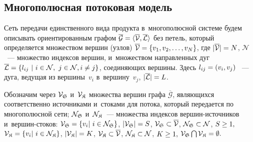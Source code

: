 \begin{multicols}{2}
\vspace*{-4pt}

\section{Многополюсная потоковая модель}

\vspace*{-2pt}

Сеть передачи единственного вида продукта в~многополюсной 
системе будем описывать ориентированным графом $\overline {\mathcal{G}} \hm= 
\langle \overline{\mathcal{V}}, \overline{\mathcal{L}} \rangle$ без петель, 
который определяется множеством вершин (узлов) $\overline{\mathcal{V}}
\hm = \{v_1,v_2,\ldots,v_ N\}$, где $|\overline{\mathcal{V}}| \hm= N$, 
$\mathcal{N}$~--- множество индексов вершин,
и~множеством направленных дуг
$\overline {\mathcal{L}}\hm =\{l_{ij} \ | \ i \in \mathcal{N}, \ j \in \mathcal{N}, 
i \not= j \}$,
соединяющих вершины. Здесь
$l_{ij} \hm= (v_i, v_j)$ ~---  дуга, ведущая из вершины~$v_i$ в~вершину~$v_j$, 
$|\overline{\mathcal{L}}| \hm= L$.

Обозначим через $\mathcal{V}_{\frak S}$ и~$\mathcal{V}_{\frak K}$  множества вершин 
графа $\overline{\mathcal{G}}$, являющихся соответственно источниками и~стоками 
для потока, который передается по многополюсной сети;
$\mathcal{N}_{\frak S}$ и~$\mathcal{N}_{\frak K}$~---  множества индексов вер\-шин-источ\-ни\-ков 
и~вер\-шин-сто\-ков:
$\mathcal{V}_\SS \hm= \{v_i | \ i \in \mathcal{N}_\SS \}$,   
$|\mathcal{V}_\SS| \hm= S$,  
$\mathcal{{V}}_\SS \hm\subset \mathcal{\overline{V}}$, 
$\mathcal{N}_\SS \hm\subset \mathcal{N}$,  $S \hm\geq 1,$
$\mathcal{V}_\SK \hm= \{v_i | \ i \in \mathcal{N}_\SK\}$,   
$|\mathcal{V}_\SK | \hm= K$, $\mathcal{V}_\SK \hm\subset \mathcal{\overline{V}}$,  
$\mathcal{N}_\SK \hm\subset \mathcal{N}$, $K \hm\geq 1, $
$\mathcal{V}_\SS \bigcap \mathcal{V}_\SK \hm= \emptyset. $


\end{multicols}

